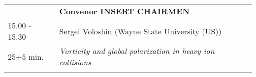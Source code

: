 \begin{longtable}{p{3cm}p{13cm}}
&\hfill {\bf Convenor INSERT CHAIRMEN }\\ 
15.00 - 15.30 & Sergei Voloshin (Wayne State University (US))\\ 
25+5 min. & {\it Vorticity and global polarization in heavy ion collisions}\\ 
 & \\ 
\end{longtable}


